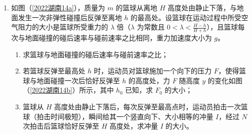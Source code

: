 \documentclass[\gkver]{gaokaozhenti}
\begin{document}
\begin{enumerate}


\item
如图（\ref{2022湖南14a}），质量为 $m$ 的篮球从离地 $H$ 高度处由静止下落，与地面发生一次非弹性碰撞后反弹至离地 $h$ 的最高处。设篮球在运动过程中所受空气阻力的大小是篮球所受重力的 $\lambda$ 倍（$\lambda$ 为常数且 $0 < \lambda < \frac{H - h}{H + h}$），且篮球每次与地面碰撞的碰后速率与碰前速率之比相同，重力加速度大小为 $g$。
\begin{enumerate}
	\item
	求篮球与地面碰撞的碰后速率与碰前速率之比；
	\item
	若篮球反弹至最高处 $h$ 时，运动员对篮球施加一个向下的压力 $F$，使得篮球与地面碰撞一次后恰好反弹至 $h$ 的高度处，力 $F$ 随高度 $y$ 的变化如图（\ref{2022湖南14b}）所示，其中 $h_{0}$ 已知，求 $F_{0}$ 的大小；
	\item
	篮球从 $H$ 高度处由静止下落后，每次反弹至最高点时，运动员拍击一次篮球（拍击时间极短），瞬间给其一个竖直向下、大小相等的冲量 $I$，经过 $N$ 次拍击后篮球恰好反弹至 $H$ 高度处，求冲量 $I$ 的大小。
\end{enumerate}


\end{enumerate}
\end{document}
